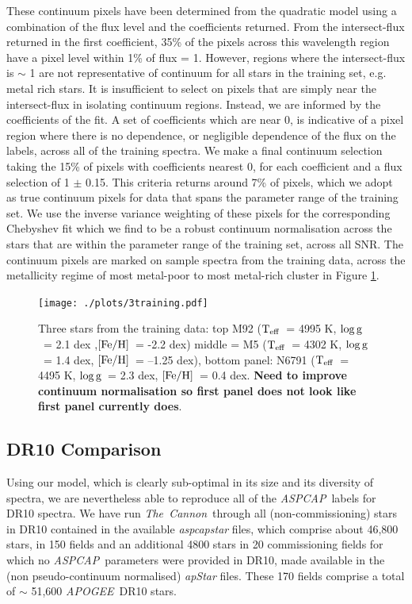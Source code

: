 \documentclass[12pt, preprint]{aastex}
\newcommand{\teff}{\mbox{$\rm T_{eff}$}}
\newcommand{\feh}{\mbox{$\rm [Fe/H]$}}
\newcommand{\logg}{\mbox{$\rm \log g$}}
\newcommand{\tc}{\textsl{The~Cannon}}
\newcommand{\apogee}{\textsl{APOGEE}}
\newcommand{\aspcap}{\textsl{ASPCAP}}
\begin{document}
These continuum pixels have been determined from the quadratic model using a combination of the flux level and the coefficients returned.  From the intersect-flux returned in the first coefficient, 35\% of the pixels across this wavelength region have a pixel level within 1\% of flux = 1. However, regions where the intersect-flux is $\sim$ 1 are not representative of continuum for all stars in the training set, e.g. metal rich stars. It is insufficient to select on pixels that are simply near the intersect-flux in isolating continuum regions. Instead, we are informed by the coefficients of the fit. A set of coefficients which are near 0, is indicative of a pixel region where there is no dependence, or negligible dependence of the flux on the labels, across all of the training spectra. We make a final continuum selection taking the 15\% of pixels with coefficients nearest 0, for each coefficient and a flux selection of 1 $\pm$ 0.15. This criteria returns around  7\% of pixels, which we adopt as true continuum pixels for data that spans the parameter range of the training set. We use the inverse variance weighting of these pixels for the corresponding Chebyshev fit which we find to be a robust continuum normalisation across the stars that are within the parameter range of the training set, across all SNR. The continuum pixels are marked on sample spectra from the training data, across the metallicity regime of most metal-poor to most metal-rich cluster in Figure \ref{fig:cal_feh}.


\begin{figure}[h!]
  \texttt{[image: ./plots/3training.pdf]}
\caption{Three stars from the training data: top M92 (\teff\ = 4995 K, \logg\ = 2.1 dex ,\feh\, = -2.2 dex) middle = M5 (\teff\ = 4302 K, \logg\ = 1.4 dex, \feh\ = --1.25 dex), bottom panel: N6791 (\teff\  = 4495 K, \logg\ = 2.3 dex, \feh\ = 0.4 dex. \textbf{Need to improve continuum normalisation so first panel does not look like first panel currently does}. }
\label{fig:cal_feh}
\end{figure}

\subsection{DR10 Comparison}

Using our model, which is clearly sub-optimal in its size and its diversity of spectra, we are nevertheless able to reproduce all of the \aspcap\ labels for DR10 spectra. We have run \tc\ through all (non-commissioning) stars in DR10 contained in the available \textit{aspcapstar} files,  which comprise about 46,800 stars, in 150 fields and an additional 4800 stars in 20 commissioning fields for which no \aspcap\ parameters were provided in DR10, made available in the (non pseudo-continuum normalised) \textit{apStar} files. These 170 fields comprise a total of $\sim$ 51,600 \apogee\ DR10 stars. 
\end{document}
